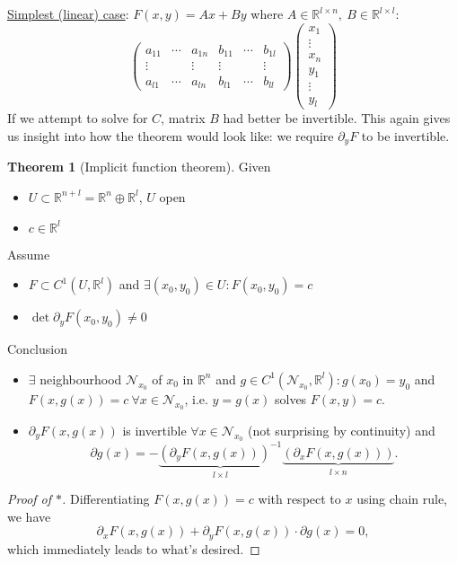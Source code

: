 \documentclass[a4paper]{article}
\theoremstyle{definition}
\newtheorem{thm}[defn]{Theorem}
\begin{document}
\underline{Simplest (linear) case}: $F(x,y)=Ax+By$ where $A\in \mathbb R^{l\times n}, \ B\in \mathbb R^{l\times l}$:
\[
\begin{pmatrix}
a_{11} & \cdots & a_{1n} & b_{11} & \cdots & b_{1l} \\
\vdots & & \vdots & \vdots & & \vdots \\
a_{l1} & \cdots & a_{ln} & b_{l1} & \cdots & b_{ll}
\end{pmatrix}
\begin{pmatrix}
    x_1 \\ \vdots \\ x_n \\ y_1 \\ \vdots \\ y_l
\end{pmatrix} 
\]
If we attempt to solve for $C$, matrix $B$ had better be invertible. This again gives us insight into how the theorem would look like: we require $\partial_y F$ to be invertible.

\begin{thm}[Implicit function theorem]
Given
\begin{itemize}
    \item $U\subset \mathbb R^{n+l}=\mathbb R^n \oplus \mathbb R^l$, $U$ open
    \item $c\in \mathbb R^l$
\end{itemize}
Assume
\begin{itemize}
    \item $F\subset C^1(U,\mathbb R^l)$ and $\exists (x_0,y_0)\in U:F(x_0,y_0)=c$
    \item $\det \partial_y F(x_0,y_0)\neq 0$
\end{itemize}
Conclusion
\begin{itemize}
    \item $\exists$ neighbourhood $\mathcal N_{x_0}$ of $x_0$ in $\mathbb R^n$ and $g\in C^1(\mathcal N_{x_0},\mathbb R^l): g(x_0)=y_0$ and $F(x,g(x)) = c\ \forall x\in \mathcal N_{x_0}$, i.e. $y=g(x)$ solves $F(x,y)=c$.
    \item $\partial_y F(x,g(x))$ is invertible $\forall x \in \mathcal N_{x_0}$ (not surprising by continuity) and
    \[
    \partial g(x) = - \underbrace{\left( \partial_y F(x,g(x)) \right)^{-1}}_{l\times l} \underbrace{\left( \partial_x F(x,g(x)) \right)}_{l\times n} .
    \tag{$\ast$}
    \]
\end{itemize}
\end{thm}
\begin{proof}[Proof of $\ast$]
Differentiating $F(x,g(x))=c$ with respect to $x$ using chain rule, we have
\[
\partial_x F(x,g(x))+\partial_y F(x,g(x)) \cdot \partial g(x)=0,
\tag{$\ast\ast$}
\]
which immediately leads to what's desired.
\end{proof}
\end{document}
